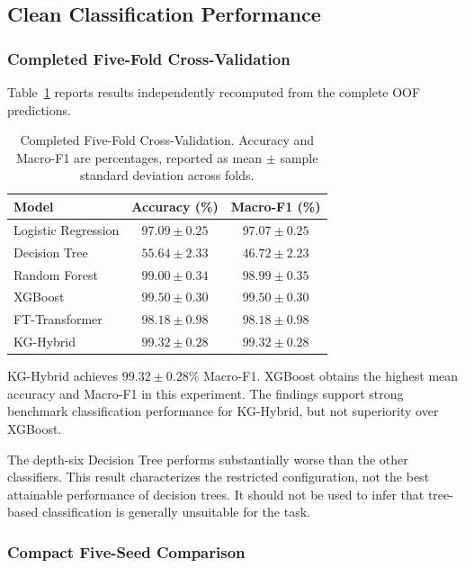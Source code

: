 \subsection{Clean Classification Performance}

\subsubsection{Completed Five-Fold Cross-Validation}

Table~\ref{tab:baseline_comparison} reports results independently
recomputed from the complete OOF predictions.

\begin{table}[t]
\centering
\caption{Completed Five-Fold Cross-Validation.
Accuracy and Macro-F1 are percentages, reported as mean
$\pm$ sample standard deviation across folds.}
\label{tab:baseline_comparison}
\small
\begin{tabular}{lcc}
\hline
Model & Accuracy (\%) & Macro-F1 (\%) \\
\hline
Logistic Regression & $97.09\pm0.25$ & $97.07\pm0.25$ \\
Decision Tree       & $55.64\pm2.33$ & $46.72\pm2.23$ \\
Random Forest       & $99.00\pm0.34$ & $98.99\pm0.35$ \\
XGBoost             & $99.50\pm0.30$ & $99.50\pm0.30$ \\
FT-Transformer      & $98.18\pm0.98$ & $98.18\pm0.98$ \\
KG-Hybrid           & $99.32\pm0.28$ & $99.32\pm0.28$ \\
\hline
\end{tabular}
\end{table}

KG-Hybrid achieves $99.32\pm0.28\%$ Macro-F1.
XGBoost obtains the highest mean accuracy and Macro-F1 in this
experiment. The findings support strong benchmark classification
performance for KG-Hybrid, but not superiority over XGBoost.

The depth-six Decision Tree performs substantially worse than the
other classifiers. This result characterizes the restricted
configuration, not the best attainable performance of decision trees.
It should not be used to infer that tree-based classification is
generally unsuitable for the task.

\subsubsection{Compact Five-Seed Comparison}

